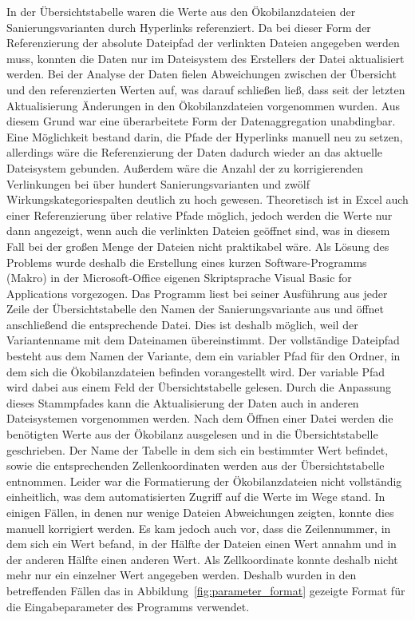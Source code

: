In der Übersichtstabelle waren die Werte aus den Ökobilanzdateien der Sanierungsvarianten durch Hyperlinks referenziert. Da bei dieser Form der Referenzierung der absolute Dateipfad der verlinkten Dateien angegeben werden muss, konnten die Daten nur im Dateisystem des Erstellers der Datei aktualisiert werden. Bei der Analyse der Daten fielen Abweichungen zwischen der Übersicht und den referenzierten Werten auf, was darauf schließen ließ, dass seit der letzten Aktualisierung Änderungen in den Ökobilanzdateien vorgenommen wurden. Aus diesem Grund war eine überarbeitete Form der Datenaggregation unabdingbar. Eine Möglichkeit bestand darin, die Pfade der Hyperlinks manuell neu zu setzen, allerdings wäre die Referenzierung der Daten dadurch wieder an das aktuelle Dateisystem gebunden. Außerdem wäre die Anzahl der zu korrigierenden Verlinkungen bei über hundert Sanierungsvarianten und zwölf Wirkungskategoriespalten deutlich zu hoch gewesen. Theoretisch ist in Excel auch einer Referenzierung über relative Pfade möglich, jedoch werden die Werte nur dann angezeigt, wenn auch die verlinkten Dateien geöffnet sind, was in diesem Fall bei der großen Menge der Dateien nicht praktikabel wäre. Als Lösung des Problems wurde deshalb die Erstellung eines kurzen Software-Programms (Makro) in der Microsoft-Office eigenen Skriptsprache Visual Basic for Applications vorgezogen. Das Programm liest bei seiner Ausführung aus jeder Zeile der Übersichtstabelle den Namen der Sanierungsvariante aus und öffnet anschließend die entsprechende Datei. Dies ist deshalb möglich, weil der Variantenname mit dem Dateinamen übereinstimmt. Der vollständige Dateipfad besteht aus dem Namen der Variante, dem ein variabler Pfad für den Ordner, in dem sich die Ökobilanzdateien befinden vorangestellt wird. Der variable Pfad wird dabei aus einem Feld der Übersichtstabelle gelesen. Durch die Anpassung dieses Stammpfades kann die Aktualisierung der Daten auch in anderen Dateisystemen vorgenommen werden. Nach dem Öffnen einer Datei werden die benötigten Werte aus der Ökobilanz ausgelesen und in die Übersichtstabelle geschrieben. Der Name der Tabelle in dem sich ein bestimmter Wert befindet, sowie die entsprechenden Zellenkoordinaten werden aus der Übersichtstabelle entnommen. Leider war die Formatierung der Ökobilanzdateien nicht vollständig einheitlich, was dem automatisierten Zugriff auf die Werte im Wege stand. In einigen Fällen, in denen nur wenige Dateien Abweichungen zeigten, konnte dies manuell korrigiert werden. Es kam jedoch auch vor, dass die Zeilennummer, in dem sich ein Wert befand, in der Hälfte der Dateien einen Wert annahm und in der anderen Hälfte einen anderen Wert. Als Zellkoordinate konnte deshalb nicht mehr nur ein einzelner Wert angegeben werden. Deshalb wurden in den betreffenden Fällen das in Abbildung~\ref{fig:parameter_format} gezeigte Format für die Eingabeparameter des Programms verwendet.  

